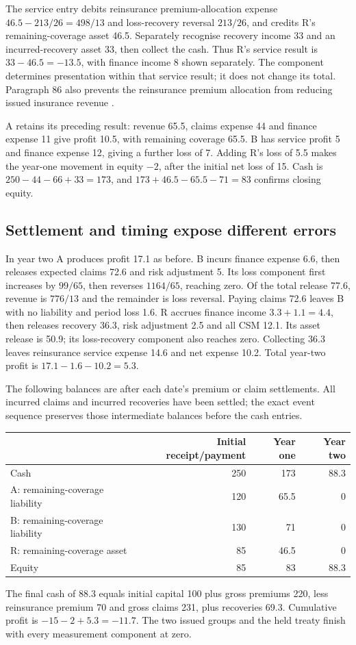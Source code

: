 The service entry debits reinsurance premium-allocation expense
\(46.5-213/26=498/13\) and loss-recovery reversal \(213/26\), and credits
R's remaining-coverage asset 46.5. Separately recognise recovery income 33
and an incurred-recovery asset 33, then collect the cash. Thus R's service
result is \(33-46.5=-13.5\), with finance income 8 shown separately.
The component determines presentation within that service result; it does
not change its total. Paragraph 86 also prevents the reinsurance premium
allocation from reducing issued insurance revenue
\citep[paragraphs 66--67, 80--88, B72, B119 and B119F]{aasb17}.

A retains its preceding result: revenue 65.5, claims expense 44 and finance
expense 11 give profit 10.5, with remaining coverage 65.5. B has service
profit 5 and finance expense 12, giving a further loss of 7. Adding R's
loss of 5.5 makes the year-one movement in equity \(-2\), after the
initial net loss of 15. Cash is \(250-44-66+33=173\), and
\(173+46.5-65.5-71=83\) confirms closing equity.

\subsection*{Settlement and timing expose different errors}

In year two A produces profit 17.1 as before. B incurs finance expense
6.6, then releases expected claims 72.6 and risk adjustment 5. Its loss
component first increases by \(99/65\), then reverses \(1164/65\), reaching
zero. Of the total release 77.6, revenue is \(776/13\) and the remainder
is loss reversal. Paying claims 72.6 leaves B with no liability and
period loss 1.6. R accrues finance income \(3.3+1.1=4.4\), then releases
recovery 36.3, risk adjustment 2.5 and all CSM 12.1. Its asset release
is 50.9; its loss-recovery component also reaches zero. Collecting 36.3
leaves reinsurance service expense 14.6 and net expense 10.2. Total
year-two profit is \(17.1-1.6-10.2=5.3\).

The following balances are after each date's premium or claim settlements.
All incurred claims and incurred recoveries have been settled; the exact
event sequence preserves those intermediate balances before the cash entries.
\begin{center}
\begin{tabular}{lrrr}
\toprule
 & Initial receipt/payment & Year one & Year two\\
\midrule
Cash & 250 & 173 & 88.3\\
A: remaining-coverage liability & 120 & 65.5 & 0\\
B: remaining-coverage liability & 130 & 71 & 0\\
R: remaining-coverage asset & 85 & 46.5 & 0\\
Equity & 85 & 83 & 88.3\\
\bottomrule
\end{tabular}
\end{center}
The final cash of 88.3 equals initial capital 100 plus gross premiums 220,
less reinsurance premium 70 and gross claims 231, plus recoveries 69.3.
Cumulative profit is \(-15-2+5.3=-11.7\). The two issued groups and the
held treaty finish with every measurement component at zero.


